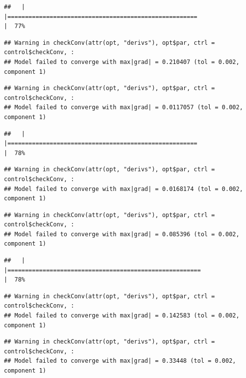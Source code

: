 \documentclass[
  12pt,
]{book}
\begin{document}
\begin{verbatim}
##   |                                                                              |======================================================                |  77%
\end{verbatim}

\begin{verbatim}
## Warning in checkConv(attr(opt, "derivs"), opt$par, ctrl = control$checkConv, :
## Model failed to converge with max|grad| = 0.210407 (tol = 0.002, component 1)
\end{verbatim}

\begin{verbatim}
## Warning in checkConv(attr(opt, "derivs"), opt$par, ctrl = control$checkConv, :
## Model failed to converge with max|grad| = 0.0117057 (tol = 0.002, component 1)
\end{verbatim}

\begin{verbatim}
##   |                                                                              |======================================================                |  78%
\end{verbatim}

\begin{verbatim}
## Warning in checkConv(attr(opt, "derivs"), opt$par, ctrl = control$checkConv, :
## Model failed to converge with max|grad| = 0.0168174 (tol = 0.002, component 1)
\end{verbatim}

\begin{verbatim}
## Warning in checkConv(attr(opt, "derivs"), opt$par, ctrl = control$checkConv, :
## Model failed to converge with max|grad| = 0.085396 (tol = 0.002, component 1)
\end{verbatim}

\begin{verbatim}
##   |                                                                              |=======================================================               |  78%
\end{verbatim}

\begin{verbatim}
## Warning in checkConv(attr(opt, "derivs"), opt$par, ctrl = control$checkConv, :
## Model failed to converge with max|grad| = 0.142583 (tol = 0.002, component 1)
\end{verbatim}

\begin{verbatim}
## Warning in checkConv(attr(opt, "derivs"), opt$par, ctrl = control$checkConv, :
## Model failed to converge with max|grad| = 0.33448 (tol = 0.002, component 1)
\end{verbatim}
\end{document}
